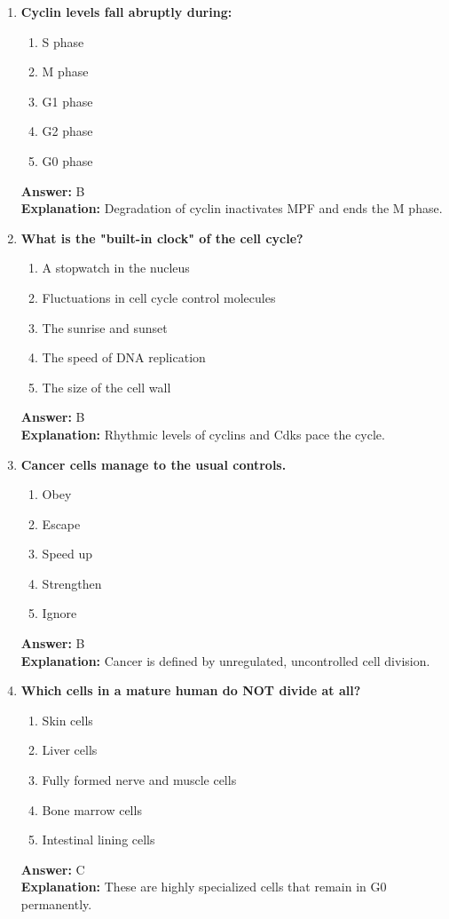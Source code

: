 \documentclass[11pt, a4paper]{article}
\begin{document}
\begin{enumerate}[leftmargin=*, label=\arabic*.]
\item \textbf{Cyclin levels fall abruptly during:}
\begin{enumerate}[label=\Alph*.]
\item S phase
\item M phase
\item G1 phase
\item G2 phase
\item G0 phase
\end{enumerate}
\textbf{Answer:} B \\
\textbf{Explanation:} Degradation of cyclin inactivates MPF and ends the M phase.

\item \textbf{What is the "built-in clock" of the cell cycle?}
\begin{enumerate}[label=\Alph*.]
\item A stopwatch in the nucleus
\item Fluctuations in cell cycle control molecules
\item The sunrise and sunset
\item The speed of DNA replication
\item The size of the cell wall
\end{enumerate}
\textbf{Answer:} B \\
\textbf{Explanation:} Rhythmic levels of cyclins and Cdks pace the cycle.

\item \textbf{Cancer cells manage to \underline{\hspace{1cm}} the usual controls.}
\begin{enumerate}[label=\Alph*.]
\item Obey
\item Escape
\item Speed up
\item Strengthen
\item Ignore
\end{enumerate}
\textbf{Answer:} B \\
\textbf{Explanation:} Cancer is defined by unregulated, uncontrolled cell division.

\item \textbf{Which cells in a mature human do NOT divide at all?}
\begin{enumerate}[label=\Alph*.]
\item Skin cells
\item Liver cells
\item Fully formed nerve and muscle cells
\item Bone marrow cells
\item Intestinal lining cells
\end{enumerate}
\textbf{Answer:} C \\
\textbf{Explanation:} These are highly specialized cells that remain in G0 permanently.


\end{enumerate}
\end{document}
